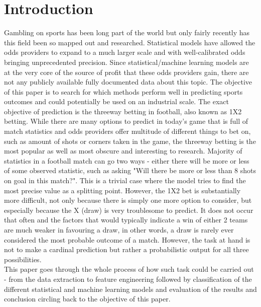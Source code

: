\documentclass{article}
\begin{document}
 
\section{Introduction}
Gambling on sports has been long part of the world but only fairly recently has this field been so mapped out and researched. Statistical models have allowed the odds providers to expand to a much larger scale and with well-calibrated odds bringing unprecedented precision. Since statistical/machine learning models are at the very core of the source of profit that these odds providers gain, there are not any publicly available fully  documented data about this topic. The objective of this paper is to search for which methods perform well in predicting sports outcomes and could potentially be used on an industrial scale. The exact objective of prediction is the threeway betting in football, also known as 1X2 betting. While there are many options to predict in today's game that is full of match statistics and odds providers offer multitude of different things to bet on, such as amount of shots or corners taken in the game, the threeway betting is the most popular as well as most obscure and interesting to research. Majority of statistics in a football match can go two ways - either there will be more or less of some observed statistic, such as asking "Will there be more or less than 8 shots on goal in this match?". This is a trivial case where the model tries to find the most precise value as a splitting point. However, the 1X2 bet is substantially more difficult, not only because there is simply one more option to consider, but especially because the X (draw) is very troublesome to predict. It does not occur that often and the factors that would typically indicate a win of either 2 teams are much weaker in favouring a draw, in other words, a draw is rarely ever considered the most probable outcome of a match. However, the task at hand is not to make a cardinal prediction but rather a probabilistic output for all three possibilities. 
\\
This paper goes through the whole process of how such task could be carried out - from the data extraction to feature engineering followed by classification of the different statistical and machine learning models and evaluation of the results and conclusion circling back to the objective of this paper.
\end{document}

